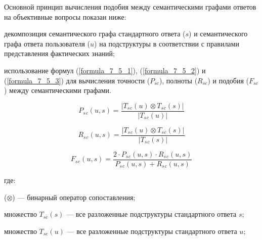 Основной принцип вычисления подобия между семантическими графами ответов на объективные вопросы показан ниже:

\begin{textitemize}
	\item декомпозиция семантического графа стандартного ответа ($s$) и семантического графа ответа пользователя ($u$) на подструктуры в соответствии с правилами представления фактических знаний;
	\item использование формул (\ref{formula_7_5_1}), (\ref{formula_7_5_2}) и (\ref{formula_7_5_3}) для вычисления точности ($P_{sc}$), полноты ($R_{sc}$) и подобия ($F_{sc}$) между семантическими графами.  
\end{textitemize}

\begin{equation}    
	P_s{_c}(u,s) = \frac{|T_s{_c}(u)\otimes T_s{_c}(s)|}{|T_s{_c}(u)|}  
	\label{formula_7_5_1} 
\end{equation}  

\begin{equation}    
	R_s{_c}(u,s) = \frac{|T_s{_c}(u)\otimes T_s{_c}(s)|}{|T_s{_c}(s)|}  
	\label{formula_7_5_2} 
\end{equation}  

\begin{equation}    
	F_s{_c}(u,s) = \frac{2\cdot P_s{_c}(u,s)\cdot R_s{_c}(u,s)}{P_s{_c}(u,s) + R_s{_c}(u,s)}  
	\label{formula_7_5_3} 
\end{equation}

где:

\begin{textitemize}
	\item ($\otimes$) --- бинарный оператор сопоставления;
	
	\item множество $T_{sc}(s)$ --- все разложенные подструктуры стандартного ответа $s$;
	
	\item множество $T_{sc}(u)$ --- все разложенные подструктуры стандартного ответа $u$;
\end{textitemize}

